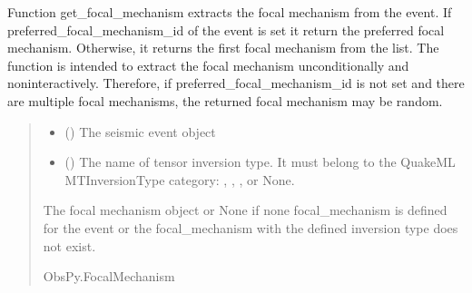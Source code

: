 \documentclass[letterpaper,10pt,english]{sphinxmanual}
\begin{document}
\begin{fulllineitems}
\label{\detokenize{api_core:core.utils.get_focal_mechanism}}
\pysigstartsignatures
{}
\pysigstopsignatures
\sphinxAtStartPar
Function get\_focal\_mechanism extracts the focal mechanism from the event.
If preferred\_focal\_mechanism\_id of the event is set it return the preferred focal mechanism.
Otherwise, it returns the first focal mechanism from the list.
The function is intended to extract the focal mechanism unconditionally and non\sphinxhyphen{}interactively.
Therefore, if preferred\_focal\_mechanism\_id is not set and there are multiple focal mechanisms,
the returned focal mechanism may be random.
\begin{quote}\begin{description}
\begin{itemize}
\item {} 
\sphinxAtStartPar
{} () \textendash{} The seismic event object

\item {} 
\sphinxAtStartPar
{} (\sphinxstyleliteralemphasis{\sphinxupquote{(}}\sphinxstyleliteralemphasis{\sphinxupquote{)}}) \textendash{} The name of tensor inversion type.
It must belong to the QuakeML MTInversionType category:
, , , or None.

\end{itemize}

\sphinxAtStartPar
The focal mechanism object or None if none focal\_mechanism is defined for the event
or the focal\_mechanism with the defined inversion type does not exist.

\sphinxAtStartPar
ObsPy.FocalMechanism

\end{description}\end{quote}

\end{fulllineitems}
\end{document}
